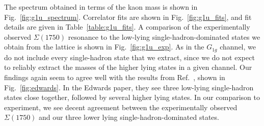 The spectrum obtained in terms of the kaon mass is shown in Fig.~\ref{fig:g1u_spectrum}. Correlator fits are shown in Fig.~\ref{fig:g1u_fits}, and fit details are given in Table~\ref{table:g1u_fits}. A comparison of the experimentally observed $\Sigma(1750)$ resonance to the low-lying single-hadron-dominated states we obtain from the lattice is shown in Fig.~\ref{fig:g1u_exp}. As in the $G_{1g}$ channel, we do not include every single-hadron state that we extract, since we do not expect to reliably extract the masses of the higher lying states in a given channel. Our findings again seem to agree well with the results from Ref.~\cite{Edwards:2012fx}, shown in Fig.~\ref{fig:edwards}. In the Edwards paper, they see three low-lying single-hadron states close together, followed by several higher lying states. In our comparison to experiment, we see decent agreement between the experimentally observed $\Sigma(1750)$ and our three lower lying single-hadron-dominated states.
